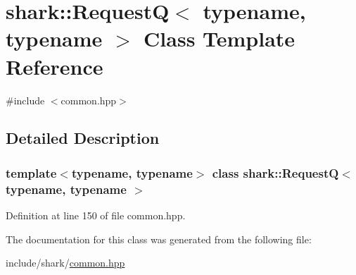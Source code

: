 \hypertarget{classshark_1_1_request_q}{}\section{shark\+:\+:RequestQ$<$ typename, typename $>$ Class Template Reference}
\label{classshark_1_1_request_q}


{\ttfamily \#include $<$common.\+hpp$>$}



\subsection{Detailed Description}
\subsubsection*{template$<$typename, typename$>$\newline
class shark\+::\+Request\+Q$<$ typename, typename $>$}



Definition at line 150 of file common.\+hpp.



The documentation for this class was generated from the following file\+:\begin{DoxyCompactItemize}
\item 
include/shark/\hyperlink{common_8hpp}{common.\+hpp}\end{DoxyCompactItemize}
